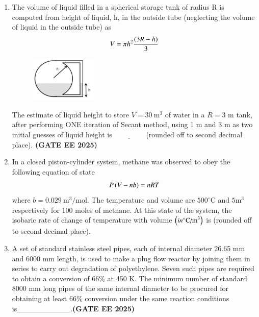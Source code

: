 \documentclass[journal,12pt,onecolumn]{IEEEtran}
\theoremstyle{remark}
\begin{document}
\begin{enumerate}
\item The volume of liquid filled in a spherical storage tank of radius R is computed from height of liquid, h, in the outside tube (neglecting the volume of liquid in the outside tube) as
\[ V=\pi h^{2}\frac{\left(3R-h\right)}{3} \]
\begin{figure}
\begin{center}
\includegraphics[width=0.3\textwidth]{figs/49.png}
     \caption{}
     \label{fig49}

\end{center}
\end{figure}
The estimate of liquid height  to store $V=30~\text{m}^{3}$ of water in a $R=3$ m tank, after performing ONE iteration of Secant method, using 1 m and 3 m as two initial guesses of liquid height is$\underline{\hspace{2cm}}$(rounded off to second decimal place). \hfill \textbf{(GATE EE 2025)} 



\item In a closed piston-cylinder system, methane was observed to obey the following equation of state
\[ P\left(V-nb\right)=nRT \]
where $b=0.029~\text{m}^{3}/\text{mol}$. The temperature and volume are $500^{\circ}\text{C}$ and $5\text{m}^{3}$ respectively for 100 moles of methane. At this state of the system, the isobaric rate of change of temperature with volume $\left(in ^{\circ}\text{C/m}^{3}\right)$ is\underline{\hspace{2cm}} (rounded off to second decimal place).



\item A set of standard stainless steel pipes, each of internal diameter 26.65 mm and 6000 mm length, is used to make a plug flow reactor by joining them in series to carry out degradation of polyethylene. Seven such pipes are required to obtain a conversion of 66\% at 450 K. The minimum number of standard 8000 mm long pipes of the same internal diameter to be procured for obtaining at least 66\% conversion under the same reaction conditions is\_\_\_\_\_\_\_\_\_\_.\hfill \textbf{(GATE EE 2025)} 





\end{enumerate}
\end{document}
